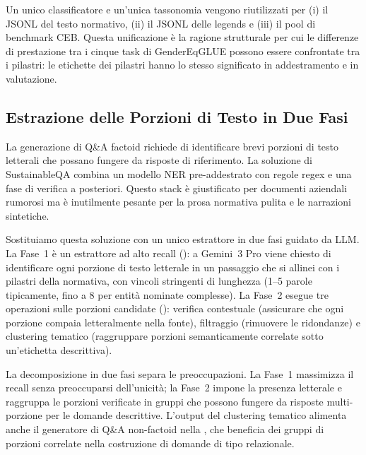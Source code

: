 \documentclass[pdflatex, sn-apa]{sn-jnl}%
\theoremstyle{thmstyleone}%
\theoremstyle{thmstyletwo}%
\theoremstyle{thmstylethree}%
\begin{document}
Un unico classificatore e un'unica tassonomia vengono riutilizzati per (i) il
JSONL del testo normativo, (ii) il JSONL delle legends e (iii) il pool di
benchmark CEB. Questa unificazione è la ragione strutturale per cui le differenze
di prestazione tra i cinque task di GenderEqGLUE possono essere confrontate tra i
pilastri: le etichette dei pilastri hanno lo stesso significato in addestramento
e in valutazione.

\subsection{Estrazione delle Porzioni di Testo in Due Fasi}
\label{sec:method:spans}

La generazione di Q\&A factoid richiede di identificare brevi porzioni di testo
letterali che possano fungere da risposte di riferimento. La soluzione di
SustainableQA combina un modello NER pre-addestrato con regole regex e una fase
di verifica a posteriori. Questo stack è giustificato per documenti aziendali
rumorosi ma è inutilmente pesante per la prosa normativa pulita e le narrazioni
sintetiche.

Sostituiamo questa soluzione con un unico estrattore in due fasi guidato da LLM.
La Fase~1 è un estrattore ad alto recall (): a Gemini~3
Pro viene chiesto di identificare ogni porzione di testo letterale in un
passaggio che si allinei con i pilastri della normativa, con vincoli stringenti
di lunghezza (1--5 parole tipicamente, fino a 8 per entità nominate complesse). La
Fase~2 esegue tre operazioni sulle porzioni candidate ():
verifica contestuale (assicurare che ogni porzione compaia letteralmente nella
fonte), filtraggio (rimuovere le ridondanze) e clustering tematico (raggruppare
porzioni semanticamente correlate sotto un'etichetta descrittiva).


La decomposizione in due fasi separa le preoccupazioni. La Fase~1 massimizza il
recall senza preoccuparsi dell'unicità; la Fase~2 impone la presenza letterale e
raggruppa le porzioni verificate in gruppi che possono fungere da risposte
multi-porzione per le domande descrittive. L'output del clustering tematico
alimenta anche il generatore di Q\&A non-factoid nella , che
beneficia dei gruppi di porzioni correlate nella costruzione di domande di tipo
relazionale.
\end{document}
